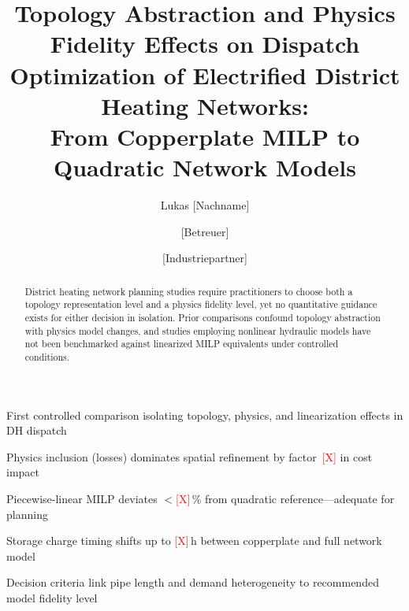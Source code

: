 \documentclass[review,3p]{elsarticle}
\newcommand{\placeholder}[1]{\textcolor{red}{[#1]}}
\begin{document}
\begin{frontmatter}

\title{Topology Abstraction and Physics Fidelity Effects on Dispatch
Optimization of Electrified District Heating Networks:\\
From Copperplate MILP to Quadratic Network Models}

\author[tum]{Lukas [Nachname]}
\author[tum]{[Betreuer]}
\author[partner]{[Industriepartner]}


\address[tum]{Lehrstuhl für Energiewirtschaft und Anwendungstechnik,
  Technische Universität München, München, Germany}
\address[partner]{[Industriepartner Institution], [Stadt], Austria}

\begin{highlights}
  \item First controlled comparison isolating topology, physics, and
        linearization effects in DH dispatch
  \item Physics inclusion (losses) dominates spatial refinement by
        factor~\placeholder{X} in cost impact
  \item Piecewise-linear MILP deviates $<$\placeholder{X}\,\% from
        quadratic reference---adequate for planning
  \item Storage charge timing shifts up to \placeholder{X}\,h between
        copperplate and full network model
  \item Decision criteria link pipe length and demand heterogeneity
        to recommended model fidelity level
\end{highlights}

\begin{abstract}
District heating network planning studies require practitioners to
choose both a topology representation level and a physics fidelity
level, yet no quantitative guidance exists for either decision in
isolation. Prior comparisons confound topology abstraction with
physics model changes, and studies employing nonlinear hydraulic
models have not been benchmarked against linearized MILP equivalents
under controlled conditions.


\end{abstract}
\end{frontmatter}
\end{document}
